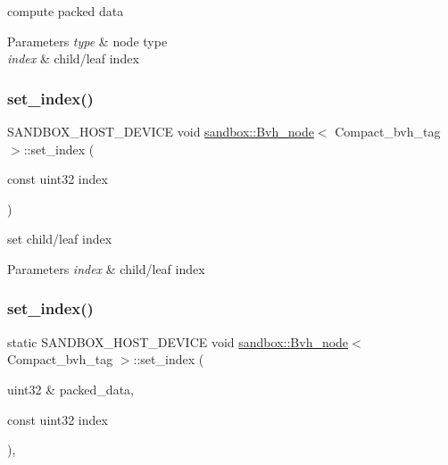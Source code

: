 compute packed data


\begin{DoxyParams}{Parameters}
{\em type} & node type \\
\hline
{\em index} & child/leaf index \\
\hline
\end{DoxyParams}
\mbox{\label{structsandbox_1_1_bvh__node_3_01_compact__bvh__tag_01_4_a2e865b886cedb85a1c0b8c2e470e9719}} 
\subsubsection{\texorpdfstring{set\+\_\+index()}{set\_index()}\hspace{0.1cm}{\footnotesize\ttfamily [1/2]}}
{\footnotesize\ttfamily S\+A\+N\+D\+B\+O\+X\+\_\+\+H\+O\+S\+T\+\_\+\+D\+E\+V\+I\+CE void \hyperlink{structsandbox_1_1_bvh__node}{sandbox\+::\+Bvh\+\_\+node}$<$ Compact\+\_\+bvh\+\_\+tag $>$\+::set\+\_\+index (\begin{DoxyParamCaption}\item[{const uint32}]{index }\end{DoxyParamCaption})}

set child/leaf index


\begin{DoxyParams}{Parameters}
{\em index} & child/leaf index \\
\hline
\end{DoxyParams}
\mbox{\label{structsandbox_1_1_bvh__node_3_01_compact__bvh__tag_01_4_a52bfb193b48c41677ca454b7e63e0117}} 
\subsubsection{\texorpdfstring{set\+\_\+index()}{set\_index()}\hspace{0.1cm}{\footnotesize\ttfamily [2/2]}}
{\footnotesize\ttfamily static S\+A\+N\+D\+B\+O\+X\+\_\+\+H\+O\+S\+T\+\_\+\+D\+E\+V\+I\+CE void \hyperlink{structsandbox_1_1_bvh__node}{sandbox\+::\+Bvh\+\_\+node}$<$ Compact\+\_\+bvh\+\_\+tag $>$\+::set\+\_\+index (\begin{DoxyParamCaption}\item[{uint32 \&}]{packed\+\_\+data,  }\item[{const uint32}]{index }\end{DoxyParamCaption})\hspace{0.3cm}{\ttfamily [inline]}, {\ttfamily [static]}}

